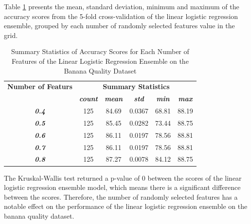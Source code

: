 \documentclass[10pt, conference]{IEEEtran}
\begin{document}
Table \ref{table: BQ_features_linear_performance_metrics} presents the mean, standard deviation, minimum and maximum of the
accuracy scores from the 5-fold cross-validation of the linear logistic regression ensemble, grouped by each number of randomly selected
features value in the grid.
\begin{table}[H]
    \caption{Summary Statistics of Accuracy Scores for Each Number of Features of the Linear Logistic Regression Ensemble on the Banana Quality Dataset}
    \begin{center}
        \begin{tabular}{|c||c|c|c|c|c|}
            \hline
            \textbf{Number of Featurs}&\multicolumn{5}{|c|}{\textbf{Summary Statistics}} \\
            \cline{2-6}
                       &\textbf{\textit{count}} & \textbf{\textit{mean}} & \textbf{\textit{std}} & \textbf{\textit{min}} & \textbf{\textit{max}}\\
            \hline
            \textbf{\textit{0.4}} & 125 & 84.69 & 0.0367 & 68.81 & 88.19 \\
            \textbf{\textit{0.5}} & 125 & 85.45 & 0.0282 & 73.44 & 88.75 \\
            \textbf{\textit{0.6}} & 125 & 86.11 & 0.0197 & 78.56 & 88.81 \\
            \textbf{\textit{0.7}} & 125 & 86.11 & 0.0197 & 78.56 & 88.81 \\
            \textbf{\textit{0.8}} & 125 & 87.27 & 0.0078 & 84.12 & 88.75 \\
            \hline
        \end{tabular}
    \end{center}
    \label{table: BQ_features_linear_performance_metrics}
\end{table}
The Kruskal-Wallis test returned a p-value of 0 between the scores of the linear logistic regression ensemble model,
which means there is a significant difference between the scores. Therefore, the number of randomly selected
features has a notable effect on the performance of the linear logistic regression ensemble on the banana quality dataset.
\end{document}
